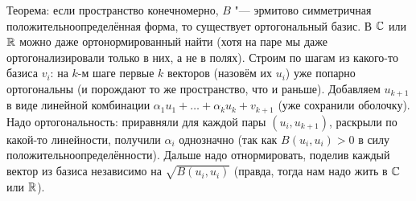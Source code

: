 Теорема: если пространство конечномерно, $B$ "--- эрмитово симметричная положительноопределённая форма, то существует ортогональный базис.
В $\mathbb{C}$ или $\mathbb{R}$ можно даже ортонормированный найти (хотя на паре мы даже ортогонализировали только в них, а не в полях).
Строим по шагам из какого-то базиса $v_i$: на $k$-м шаге первые $k$ векторов (назовём их $u_i$) уже попарно ортогональны (и порождают то же пространство, что и раньше).
Добавляем $u_{k+1}$ в виде линейной комбинации $\alpha_1u_1 + \dots + \alpha_ku_k + v_{k+1}$ (уже сохранили оболочку).
Надо ортогональность: приравняли для каждой пары $(u_i, u_{k+1})$, раскрыли по какой-то линейности, получили $\alpha_i$ однозначно (так как $B(u_i, u_i)>0$ в силу положительноопределённости).
Дальше надо отнормировать, поделив каждый вектор из базиса независимо на $\sqrt{B(u_i,u_i)}$ (правда, тогда нам надо жить в $\mathbb{C}$ или $\mathbb{R}$).

